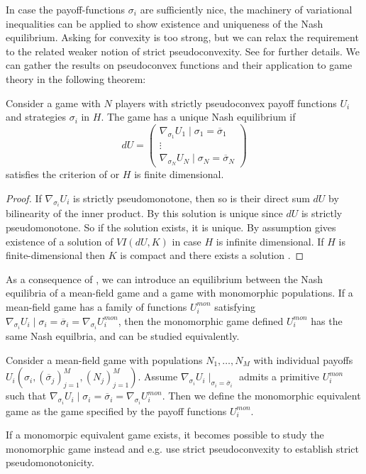 In case the payoff-functions $\sigma_i$ are sufficiently nice, the machinery of variational inequalities can be applied to show existence and uniqueness of the Nash equilibrium. Asking for convexity is too strong, but we can relax the requirement to the related weaker notion of strict pseudoconvexity. See  for further details.
We can gather the results on pseudoconvex functions and their application to game theory in the following theorem:
\begin{theorem} \label{thm:nash_unique}
  Consider a game with $N$ players with strictly pseudoconvex payoff functions $U_i$ and strategies $\sigma_i$ in $H$. The game has a unique Nash equilibrium if
  \begin{equation}
    dU=
    \begin{pmatrix}
      \nabla_{\sigma_1} U_1\mid{\sigma_1 = \overbar{\sigma}_1}\\
      \vdots \\
      \nabla_{\sigma_N} U_N \mid{\sigma_N = \overbar{\sigma}_N}
    \end{pmatrix}
  \end{equation}
  satisfies the criterion of  or $H$ is finite dimensional.
\end{theorem}
\begin{proof}
   If $\nabla_{\sigma_i} U_i$ is strictly pseudomonotone, then so is their direct sum $dU$ by bilinearity of the inner product. By  this solution is unique since $dU$ is strictly pseudomonotone. So if the solution exists, it is unique. By assumption  gives existence of a solution of $VI(dU,K)$ in case $H$ is infinite dimensional. If $H$ is finite-dimensional then $K$ is compact and there exists a solution .
\end{proof}
As a consequence of , we can introduce an equilibrium between the Nash equilibria of a mean-field game and a game with monomorphic populations. If a mean-field game has a family of functions $U_i^{mon}$ satisfying $\nabla_{\sigma_i} U_i\mid{\sigma_i = \overbar{\sigma}_i} = \nabla_{\sigma_i} U_i^{mon}$, then the monomorphic game defined $U_i^{mon}$ has the same Nash equilbria, and can be studied equivalently.
\begin{definition}
  \label{def:correspondence}
  Consider a mean-field game with populations $N_1,\dots,N_M$ with individual payoffs $U_i(\sigma_i, (\overbar{\sigma}_j)_{j=1}^M, (N_j)_{j=1}^M)$. Assume $\nabla_{\sigma_i}U_i\mid_{\sigma_i=\overbar{\sigma}_i}$ admits a primitive $U_i^{mon}$ such that $\nabla_{\sigma_i} U_i\mid{\sigma_i = \overbar{\sigma}_i} = \nabla_{\sigma_i} U_i^{mon}$.
   Then we define the monomorphic equivalent game as the game specified by the payoff functions $U_i^{mon}$.
\end{definition}
If a monomorpic equivalent game exists, it becomes possible to study the monomorphic game instead and e.g. use strict pseudoconvexity to establish strict pseudomonotonicity.

